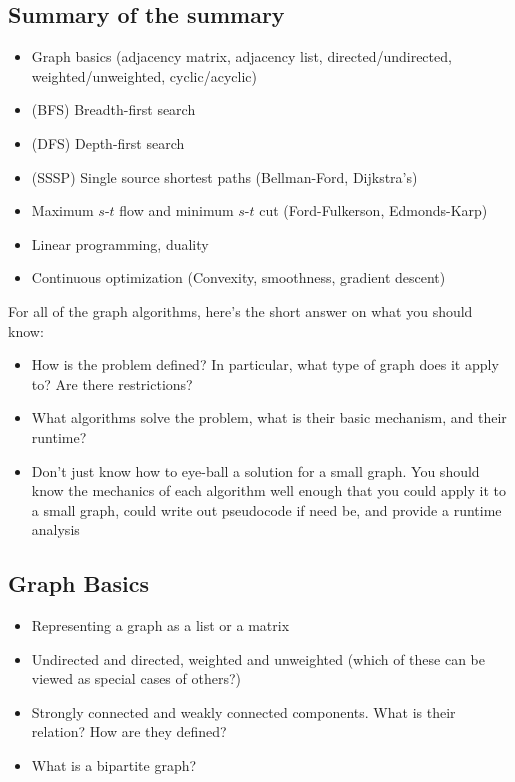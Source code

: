 \documentclass[11  pt]{exam}
\begin{document}
	\subsection{Summary of the summary}
	\begin{itemize}
		\item Graph basics (adjacency matrix, adjacency list, directed/undirected, weighted/unweighted, cyclic/acyclic)
		\item (BFS) Breadth-first search
		\item (DFS) Depth-first search
		\item (SSSP) Single source shortest paths (Bellman-Ford, Dijkstra's)
		\item Maximum $s$-$t$ flow and minimum $s$-$t$ cut (Ford-Fulkerson, Edmonds-Karp)
		\item Linear programming, duality
		\item Continuous optimization (Convexity, smoothness, gradient descent)
		\end{itemize}

For all of the graph algorithms, here's the short answer on what you should know:

\begin{itemize}
	\item How is the problem defined? In particular, what type of graph does it apply to? Are there restrictions?
	\item What algorithms solve the problem, what is their basic mechanism, and their runtime?
	\item Don't just know how to eye-ball a solution for a small graph. You should know the mechanics of each algorithm well enough that you could apply it to a small graph, could write out pseudocode if need be, and provide a runtime analysis 
\end{itemize}
	
\subsection{Graph Basics}
	
	\begin{itemize}
		\item Representing a graph as a list or a matrix
		\item Undirected and directed, weighted and unweighted (which of these can be viewed as special cases of others?)
		\item Strongly connected and weakly connected components. What is their relation? How are they defined?
		\item What is a bipartite graph?
	\end{itemize}
\end{document}
